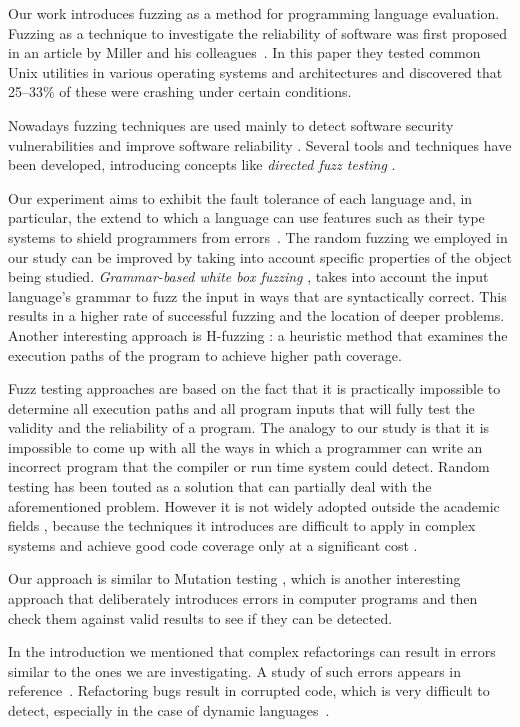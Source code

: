 \documentclass[10pt]{sigplanconf}
\begin{document}
Our work introduces fuzzing as a method for programming language
evaluation.
Fuzzing as a technique to investigate the reliability of software
was first proposed in an article by Miller and his colleagues~\cite{MFS90}.
In this paper they tested common Unix
utilities in various operating systems and architectures and discovered that
25--33\% of these were crashing under certain conditions.

Nowadays fuzzing techniques are used mainly to detect software security
vulnerabilities and improve software reliability \cite{TJC08,GODE07}.
Several tools and techniques \cite{WWGZ11} have been developed,
introducing concepts like \textit{directed fuzz testing} \cite{GLRI09}.

Our experiment aims to exhibit the fault tolerance of each language
and, in particular, the extend to which a language can use features such as
their type systems to shield programmers from errors~\cite{LYU95,KOKR07}.
The random fuzzing we employed in our study can be improved by taking
into account specific properties of the object being studied.
{\em Grammar-based white box fuzzing} \cite{God08},
takes into account the input language's grammar to fuzz the input in
ways that are syntactically correct.
This results in a higher rate of successful fuzzing and the location
of deeper problems.
Another interesting approach is H-fuzzing \cite{ZWZH11}:
a heuristic method that examines the execution paths of the program
to achieve higher path coverage.

Fuzz testing approaches are based on the fact that it is practically
impossible to determine all execution paths and all program inputs that will
fully test the validity and the reliability of a program.
The analogy to our study is that it is impossible to come up with all
the ways in which a programmer can write an incorrect program that the
compiler or run time system could detect.
Random testing \cite{HAM06} has been touted as a solution that can partially
deal with the aforementioned problem.
However it is not widely adopted outside the academic fields \cite{GGBO07},
because the techniques it introduces are difficult to apply
in complex systems and achieve good code coverage only at a significant cost
\cite{RAWO06}.

Our approach is similar to Mutation testing \cite{JIHA10}, which 
is another interesting approach that deliberately introduces errors in 
computer programs and then check them against valid results to see if they
can be detected.

In the introduction we mentioned that complex refactorings can
result in errors similar to the ones we are investigating.
A study of such errors appears in reference~\cite{DDGM07}.
Refactoring bugs result in corrupted code,
which is very difficult to detect, especially in the case of dynamic
languages~\cite{SCHA12,FFM11}.
\end{document}

